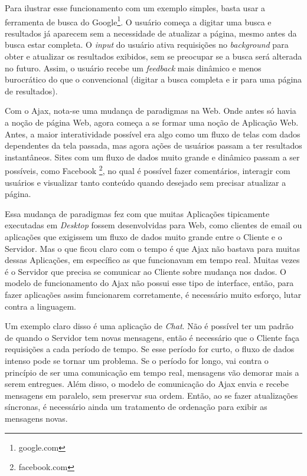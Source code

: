 \documentclass[a4paper,12pt]{article}
\begin{document}
Para ilustrar esse funcionamento com um exemplo simples, basta usar a ferramenta de busca do Google\footnote{google.com}. O usuário começa a digitar uma busca e resultados já aparecem sem a necessidade de atualizar a página, mesmo antes da busca estar completa. O \emph{input} do usuário ativa requisições no \emph{background} para obter e atualizar os resultados exibidos, sem se preocupar se a busca será alterada no futuro. Assim, o usuário recebe um \emph{feedback} mais dinâmico e menos burocrático do que o convencional (digitar a busca completa e ir para uma página de resultados).

Com o Ajax, nota-se uma mudança de paradigmas na Web. Onde antes só havia a noção de página Web, agora começa a se formar uma noção de Aplicação Web. Antes, a maior interatividade possível era algo como um fluxo de telas com dados dependentes da tela passada, mas agora ações de usuários passam a ter resultados instantâneos. Sites com um fluxo de dados muito grande e dinâmico passam a ser possíveis, como Facebook \footnote{facebook.com}, no qual é possível fazer comentários, interagir com usuários e visualizar tanto conteúdo quando desejado sem precisar atualizar a página.

Essa mudança de paradigmas fez com que muitas Aplicações tipicamente executadas em \emph{Desktop} fossem desenvolvidas para Web, como clientes de email ou aplicações que exigissem um fluxo de dados muito grande entre o Cliente e o Servidor. Mas o que ficou claro com o tempo é que Ajax não bastava para muitas dessas Aplicações, em específico as que funcionavam em tempo real. Muitas vezes é o Servidor que precisa se comunicar ao Cliente sobre mudança nos dados. O modelo de funcionamento do Ajax não possui esse tipo de interface, então, para fazer aplicações assim funcionarem corretamente, é necessário muito esforço, lutar contra a linguagem.

Um exemplo claro disso é uma aplicação de \emph{Chat}. Não é possível ter um padrão de quando o Servidor tem novas mensagens, então é necessário que o Cliente faça requisições a cada período de tempo. Se esse período for curto, o fluxo de dados intenso pode se tornar um problema. Se o período for longo, vai contra o princípio de ser uma comunicação em tempo real, mensagens vão demorar mais a serem entregues. Além disso, o modelo de comunicação do Ajax envia e recebe mensagens em paralelo, sem preservar sua ordem. Então, ao se fazer atualizações síncronas, é necessário ainda um tratamento de ordenação para exibir as mensagens novas.
\end{document}
